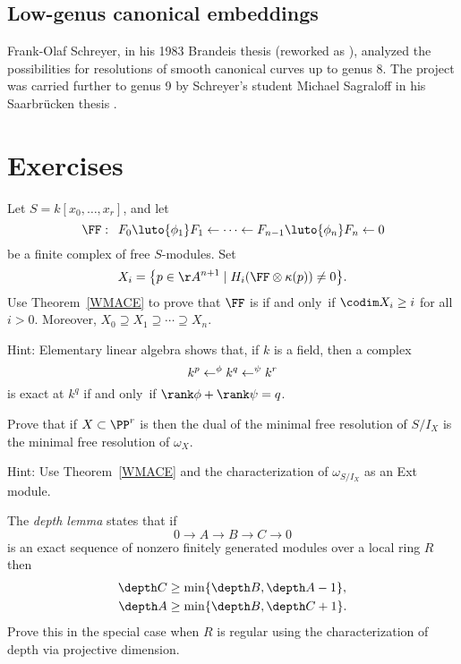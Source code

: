 \subsection*{Low-genus canonical embeddings}
Frank-Olaf
Schreyer, in his 1983 Brandeis
thesis 
(reworked as \cite{Schreyer-canonical}),
analyzed the possibilities for reso\-lutions of smooth
canonical curves up to genus 8. The project was carried further to
genus 9 by Schreyer's student
Michael Sagraloff 
in his Saarbr\"ucken thesis \citeyear{Sagraloff}.


\section{Exercises}

\begin{exercise}\label{WMACE corollary}
Let $S = k[x_0,\dots, x_r]$, and let
$$
\FF:\quad  
F_0\luto{\phi_1}F_1 \leftarrow \cdots \leftarrow F_{n-1}\luto{\phi_n} F_n\leftarrow 0
$$
be a finite complex of free $S$-modules. Set
$$
X_i =\big\{p\in \AA^{n+1} \mid  H_i(\FF \otimes \kappa(p)) \neq 0 \big\}.
$$
Use Theorem~\ref{WMACE} to prove that $\FF$ is 
%
if and only~if
$
\codim X_i \geq i
$
for all $i>0$. Moreover, $X_{0}\supseteq X_{1}\supseteq \cdots \supseteq
X_{n}$.

Hint: Elementary linear algebra shows that, if $k$ is a field, then a
complex $$k^p \lTo^{\phi} k^q \lTo^\psi k^r$$ is exact at $k^q$ if and
only~if $\rank \phi +\rank \psi = q$.
\end{exercise}

\begin{exercise}
Prove that if $X\subset \PP^r$ is 
%
then
the dual of the minimal free resolution of $S/I_X$
is the minimal free resolution of $\omega_X$.

Hint: Use Theorem~\ref{WMACE}
and the characterization of $\omega_{S/I_X}$
as an Ext module.
\end{exercise}

\begin{exercise}
The \emph{depth lemma} states that if
%
$$
0\to A\to B\to C \to 0
$$
is an exact sequence of nonzero finitely generated modules over a local
ring $R$ then
$$
\begin{aligned}
\depth C &\geq \min\{\depth B, \depth A-1\},\\
\depth A & \geq \min\{\depth B, \depth C +1\}.
\end{aligned}
$$
Prove this in the special case when $R$ is regular using the
characterization of depth
via projective dimension.
\end{exercise}

